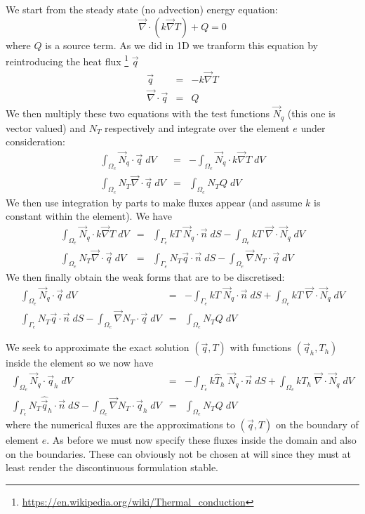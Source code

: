 We start from the steady state (no advection) energy equation:
\[
\vec\nabla\cdot (k \vec\nabla T) + Q = 0
\]
where $Q$ is a source term.
As we did in 1D we tranform this equation by reintroducing the heat flux
\footnote{\url{https://en.wikipedia.org/wiki/Thermal_conduction}} $\vec{q}$ 
\begin{eqnarray}
\vec q &=& - k \vec\nabla T \\
\vec\nabla \cdot \vec q &=& Q
\end{eqnarray}
We then multiply these two equations with the test functions $\vec{N}_q$ (this one 
is vector valued) and 
$N_T$ respectively and integrate over the element $e$ under consideration:
\begin{eqnarray}
\int_{\Omega_e} \vec{N}_q \cdot  \vec q  \; dV &=& - \int_{\Omega_e} \vec{N}_q \cdot k \vec\nabla T\; dV \\
\int_{\Omega_e} N_T \vec\nabla \cdot \vec q \;  dV &=& \int_{\Omega_e} N_T Q \; dV
\end{eqnarray}
We then use integration by parts to make fluxes appear (and assume $k$ is constant within 
the element). We have
\begin{eqnarray}
\int_{\Omega_e} \vec{N}_q \cdot k \vec\nabla T \; dV 
&=& \int_{\Gamma_e} kT \;  \vec{N}_q \cdot \vec{n} \; dS 
- \int _{\Omega_e}  kT \;  \vec\nabla\cdot \vec{N}_q  \;  dV \\
\int_{\Omega_e} N_T \vec\nabla \cdot \vec q \; dV 
&=& \int_{\Gamma_e} {N}_T \vec{q} \cdot \vec{n}  \; dS
- \int_{\Omega_e} \vec\nabla N_T \cdot \vec q \; dV 
\end{eqnarray}
We then finally obtain the weak forms that are to be discretised:
\begin{eqnarray}
\int_{\Omega_e} \vec{N}_q \cdot  \vec q \; dV &=& 
-\int_{\Gamma_e} kT \;  \vec{N}_q \cdot \vec{n} \; dS 
+ \int _{\Omega_e}  kT \;  \vec\nabla\cdot \vec{N}_q  \;  dV \\
\int_{\Gamma_e}    {N}_T  \vec{q}\cdot \vec{n}  \; dS
- \int_{\Omega_e} \vec\nabla N_T \cdot \vec q \; dV 
&=& \int_{\Omega_e} N_T Q \; dV
\end{eqnarray}

We seek to approximate the exact solution $(\vec{q},T)$ with functions $(\vec{q}_h,T_h)$ inside the element so we 
now have 
\begin{eqnarray}
\int_{\Omega_e} \vec{N}_q \cdot  \vec q_h \; dV &=& 
-\int_{\Gamma_e} k \hat{T}_h \;  \vec{N}_q \cdot \vec{n} \; dS 
+ \int _{\Omega_e}  k T_h \;  \vec\nabla\cdot \vec{N}_q  \;  dV \\
\int_{\Gamma_e}    {N}_T \hat{\vec{q}}_h \cdot \vec{n}  \; dS
- \int_{\Omega_e} \vec\nabla N_T \cdot \vec{q}_h \; dV 
&=& \int_{\Omega_e} N_T Q \; dV
\end{eqnarray}
where the numerical fluxes are the approximations to $(\vec{q},T)$ on the boundary of element $e$.
As before we must now specify these fluxes inside the domain and also on the boundaries. These
can obviously not be chosen at will since they must at least render the discontinuous formulation stable.



